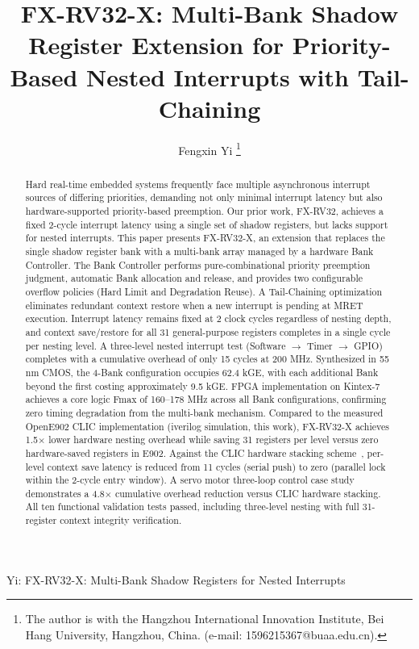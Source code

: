 \documentclass[letterpaper,journal]{IEEEtran}
\begin{document}
\title{FX-RV32-X: Multi-Bank Shadow Register Extension for Priority-Based Nested Interrupts with Tail-Chaining}

\author{Fengxin Yi
\thanks{The author is with the Hangzhou International Innovation Institute, Bei Hang University, Hangzhou, China. (e-mail: 1596215367@buaa.edu.cn).}%
}

%
{Yi: FX-RV32-X: Multi-Bank Shadow Registers for Nested Interrupts}

\maketitle

\begin{abstract}
Hard real-time embedded systems frequently face multiple asynchronous interrupt sources of differing priorities, demanding not only minimal interrupt latency but also hardware-supported priority-based preemption.
Our prior work, FX-RV32, achieves a fixed 2-cycle interrupt latency using a single set of shadow registers, but lacks support for nested interrupts.
This paper presents FX-RV32-X, an extension that replaces the single shadow register bank with a multi-bank array managed by a hardware Bank Controller.
The Bank Controller performs pure-combinational priority preemption judgment, automatic Bank allocation and release, and provides two configurable overflow policies (Hard Limit and Degradation Reuse).
A Tail-Chaining optimization eliminates redundant context restore when a new interrupt is pending at MRET execution.
Interrupt latency remains fixed at 2 clock cycles regardless of nesting depth, and context save/restore for all 31 general-purpose registers completes in a single cycle per nesting level.
A three-level nested interrupt test (Software $\rightarrow$ Timer $\rightarrow$ GPIO) completes with a cumulative overhead of only 15 cycles at 200 MHz.
Synthesized in 55 nm CMOS, the 4-Bank configuration occupies 62.4 kGE, with each additional Bank beyond the first costing approximately 9.5 kGE. FPGA implementation on Kintex-7 achieves a core logic Fmax of 160--178 MHz across all Bank configurations, confirming zero timing degradation from the multi-bank mechanism.
Compared to the measured OpenE902 CLIC implementation (iverilog simulation, this work), FX-RV32-X achieves 1.5$\times$ lower hardware nesting overhead while saving 31 registers per level versus zero hardware-saved registers in E902.
Against the CLIC hardware stacking scheme~\cite{ref5}, per-level context save latency is reduced from 11 cycles (serial push) to zero (parallel lock within the 2-cycle entry window).
A servo motor three-loop control case study demonstrates a 4.8$\times$ cumulative overhead reduction versus CLIC hardware stacking.
All ten functional validation tests passed, including three-level nesting with full 31-register context integrity verification.
\end{abstract}
\end{document}
